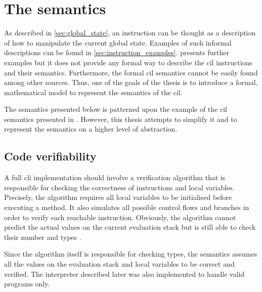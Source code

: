 \documentclass{article}
\numberwithin{equation}{section}
\begin{document}
\clearpage


\section{The semantics}
\label{sec:semantics}

As described in \ref{sec:global_state}, an instruction can be thought as a description of how to manipulate the current global state. Examples of such informal descriptions can be found in \ref{sec:instruction_examples}. \cite{ecmaStandard} presents further examples but it does not provide any formal way to describe the \acrshort{cil} instructions and their semantics. Furthermore, the formal \acrshort{cil} semantics cannot be easily found among other sources. Thus, one of the goals of the thesis is to introduce a formal, mathematical model to represent the semantics of the \acrshort{cil}.

The semantics presented below is patterned upon the example of the \acrshort{cil} semantics presented in \cite{zychlaThesis}. However, this thesis attempts to simplify it and to represent the semantics on a higher level of abstraction.

\subsection{Code verifiability}
\label{sec:codeVerifiability}

A full \acrshort{cli} implementation should involve a verification algorithm that is responsible for checking the correctness of instructions and local variables. Precisely, the algorithm requires all local variables to be initialised before executing a method. It also simulates all possible control flows and branches in order to verify each reachable instruction. Obviously, the algorithm cannot predict the actual values on the current evaluation stack but is still able to check their number and types \cite{expertIl}.

Since the algorithm itself is responsible for checking types, the semantics assumes all the values on the evaluation stack and local variables to be correct and verified. The interpreter described later was also implemented to handle valid programs only.
\end{document}
